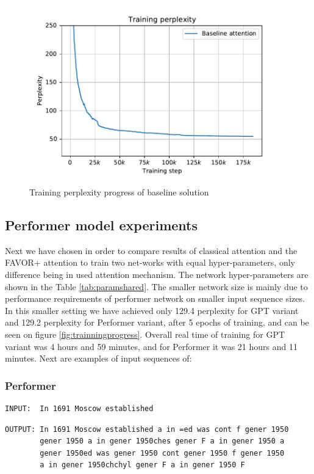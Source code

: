 \begin{figure}[H]
    \centering
    \includegraphics[height=8cm]{obrazky/train_baseline.pdf}
    \caption{Training perplexity progress of baseline solution}
    \label{fig:trainning_progress_baseline}
\end{figure}

\subsection{Performer model experiments}

Next we have chosen in order to compare results of classical attention and the FAVOR+ attention to train two net-works with equal hyper-parameters, only difference being in used attention mechanism. The network hyper-parameters are shown in the Table \ref{tab:paramshared}. The smaller network size is mainly due to performance requirements of performer network on smaller input sequence sizes.  In this smaller setting we have achieved only 129.4 perplexity for GPT variant and 129.2 perplexity for Performer variant, after 5 epochs of training, and can be seen on figure \ref{fig:trainningprogress}. Overall real time of training for GPT variant was 4 hours and 59 minutes, and for Performer it was 21 hours and 11 minutes. Next are examples of input sequences of:
\newpage
\subsubsection*{Performer}
\begin{verbatim}
INPUT:  In 1691 Moscow established
\end{verbatim}
\begin{verbatim}
OUTPUT: In 1691 Moscow established a in =ed was cont f gener 1950
        gener 1950 a in gener 1950ches gener F a in gener 1950 a 
        gener 1950ed was gener 1950 cont gener 1950 f gener 1950 
        a in gener 1950chchyl gener F a in gener 1950 F
\end{verbatim}

